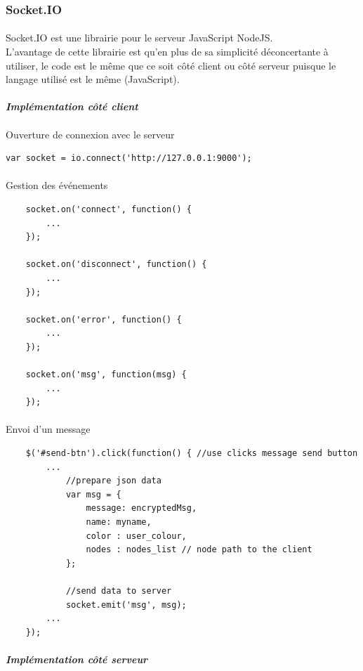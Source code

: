 \documentclass[a4paper,12pt]{report}
\begin{document}
	\subsubsection{Socket.IO}
	\paragraph*{}
	Socket.IO est une librairie pour le serveur JavaScript NodeJS. \\
	L'avantage de cette librairie est qu'en plus de sa simplicité déconcertante à utiliser, le code est le même que ce soit côté client ou côté serveur puisque le langage utilisé est le même (JavaScript). 
	\paragraph*{}
	\textit{\textbf{Implémentation côté client}} 
	\paragraph*{}
	Ouverture de connexion avec le serveur
	\begin{lstlisting}
var socket = io.connect('http://127.0.0.1:9000');
	\end{lstlisting}
	\paragraph*{}
	Gestion des événements 
	\begin{lstlisting}
	socket.on('connect', function() {
		...
	});

	socket.on('disconnect', function() {
		...
	});

	socket.on('error', function() {
		...
	});

	socket.on('msg', function(msg) {
		...
	});
	\end{lstlisting}	
	\paragraph*{}
	Envoi d'un message 
	\begin{lstlisting}
	$('#send-btn').click(function() { //use clicks message send button	
		...
	    	//prepare json data
			var msg = {
				message: encryptedMsg,
				name: myname,
				color : user_colour,
				nodes : nodes_list // node path to the client
			};

			//send data to server
			socket.emit('msg', msg);
		...
	});
	\end{lstlisting}		 
	\paragraph*{}
	\textit{\textbf{Implémentation côté serveur}} 
\end{document}
